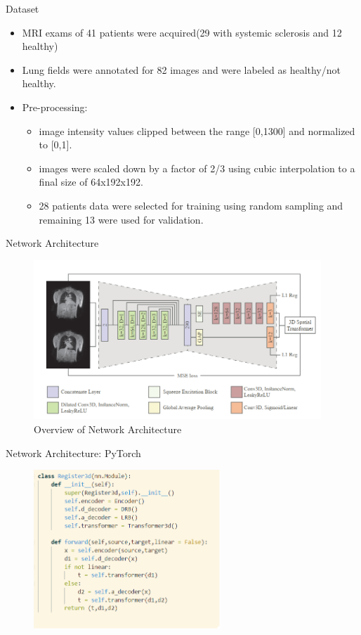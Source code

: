 \documentclass{beamer}
\begin{document}
\begin{frame}{Dataset}
    \begin{itemize}
        \item MRI exams of 41 patients were acquired(29 with systemic sclerosis and 12 healthy)
        \item Lung fields were annotated for 82 images and were labeled as healthy/not healthy.
        \pause
        \item Pre-processing:
        \begin{itemize}
            \item image intensity values clipped between the range [0,1300] and normalized to [0,1].
            \item images were scaled down by a factor of 2/3 using cubic interpolation to a final size of 64x192x192.
            \item 28 patients data were selected for training using random sampling and remaining 13 were used for validation.
        \end{itemize}
    \end{itemize}
\end{frame}

\begin{frame}{Network Architecture}
    \begin{figure}
        \centering
        \includegraphics[height=6cm]{network_architecture.png}
        \caption{Overview of Network Architecture}
        \label{fig:overview}
    \end{figure}
\end{frame}

\begin{frame}{Network Architecture: PyTorch}
    \begin{figure}
        \centering
        \includegraphics[height=6cm]{overview.PNG}
        \label{fig:code}
    \end{figure}
\end{frame}
\end{document}
